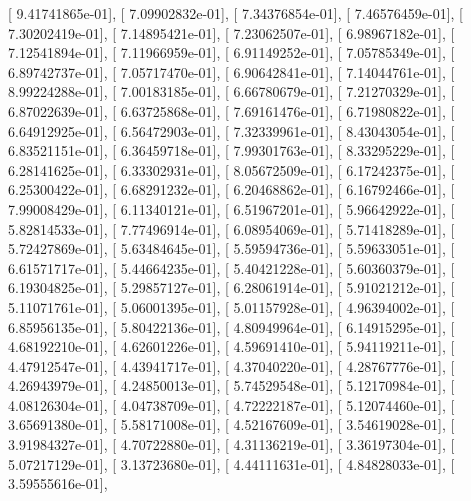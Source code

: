 \documentclass{article}
\begin{document}
       [  9.41741865e-01],
       [  7.09902832e-01],
       [  7.34376854e-01],
       [  7.46576459e-01],
       [  7.30202419e-01],
       [  7.14895421e-01],
       [  7.23062507e-01],
       [  6.98967182e-01],
       [  7.12541894e-01],
       [  7.11966959e-01],
       [  6.91149252e-01],
       [  7.05785349e-01],
       [  6.89742737e-01],
       [  7.05717470e-01],
       [  6.90642841e-01],
       [  7.14044761e-01],
       [  8.99224288e-01],
       [  7.00183185e-01],
       [  6.66780679e-01],
       [  7.21270329e-01],
       [  6.87022639e-01],
       [  6.63725868e-01],
       [  7.69161476e-01],
       [  6.71980822e-01],
       [  6.64912925e-01],
       [  6.56472903e-01],
       [  7.32339961e-01],
       [  8.43043054e-01],
       [  6.83521151e-01],
       [  6.36459718e-01],
       [  7.99301763e-01],
       [  8.33295229e-01],
       [  6.28141625e-01],
       [  6.33302931e-01],
       [  8.05672509e-01],
       [  6.17242375e-01],
       [  6.25300422e-01],
       [  6.68291232e-01],
       [  6.20468862e-01],
       [  6.16792466e-01],
       [  7.99008429e-01],
       [  6.11340121e-01],
       [  6.51967201e-01],
       [  5.96642922e-01],
       [  5.82814533e-01],
       [  7.77496914e-01],
       [  6.08954069e-01],
       [  5.71418289e-01],
       [  5.72427869e-01],
       [  5.63484645e-01],
       [  5.59594736e-01],
       [  5.59633051e-01],
       [  6.61571717e-01],
       [  5.44664235e-01],
       [  5.40421228e-01],
       [  5.60360379e-01],
       [  6.19304825e-01],
       [  5.29857127e-01],
       [  6.28061914e-01],
       [  5.91021212e-01],
       [  5.11071761e-01],
       [  5.06001395e-01],
       [  5.01157928e-01],
       [  4.96394002e-01],
       [  6.85956135e-01],
       [  5.80422136e-01],
       [  4.80949964e-01],
       [  6.14915295e-01],
       [  4.68192210e-01],
       [  4.62601226e-01],
       [  4.59691410e-01],
       [  5.94119211e-01],
       [  4.47912547e-01],
       [  4.43941717e-01],
       [  4.37040220e-01],
       [  4.28767776e-01],
       [  4.26943979e-01],
       [  4.24850013e-01],
       [  5.74529548e-01],
       [  5.12170984e-01],
       [  4.08126304e-01],
       [  4.04738709e-01],
       [  4.72222187e-01],
       [  5.12074460e-01],
       [  3.65691380e-01],
       [  5.58171008e-01],
       [  4.52167609e-01],
       [  3.54619028e-01],
       [  3.91984327e-01],
       [  4.70722880e-01],
       [  4.31136219e-01],
       [  3.36197304e-01],
       [  5.07217129e-01],
       [  3.13723680e-01],
       [  4.44111631e-01],
       [  4.84828033e-01],
       [  3.59555616e-01],
\end{document}
